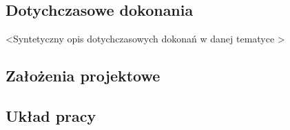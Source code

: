   \subsection{Dotychczasowe dokonania}
    \tab \textless Syntetyczny opis dotychczasowych dokonań w danej tematyce \textgreater

  \subsection{Założenia projektowe}

  \subsection{Układ pracy}

